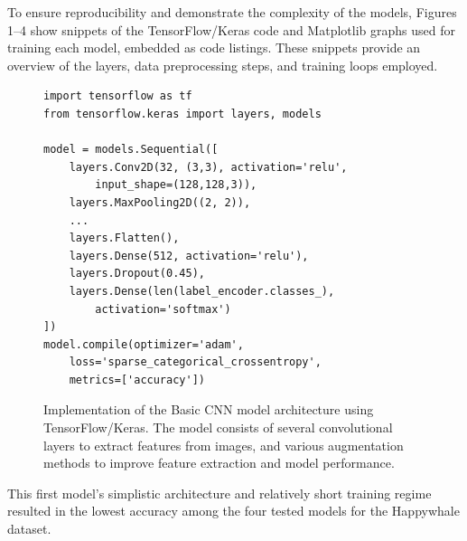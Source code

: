\documentclass[twocolumn]{article}
\begin{document}
To ensure reproducibility and demonstrate the complexity of the models, Figures 1–4 show snippets of the TensorFlow/Keras code and Matplotlib graphs used for training each model, embedded as code listings. These snippets provide an overview of the layers, data preprocessing steps, and training loops employed.

\lstset{
    language=Python,
    basicstyle=\footnotesize\ttfamily,
    breaklines=true,
    columns=fullflexible,
    frame=single
}

\begin{figure}[H]
\centering
\begin{minipage}{0.95\linewidth}
\begin{lstlisting}
import tensorflow as tf
from tensorflow.keras import layers, models

model = models.Sequential([
    layers.Conv2D(32, (3,3), activation='relu',
        input_shape=(128,128,3)),
    layers.MaxPooling2D((2, 2)),
    ...
    layers.Flatten(),
    layers.Dense(512, activation='relu'),
    layers.Dropout(0.45),
    layers.Dense(len(label_encoder.classes_),
        activation='softmax')
])
model.compile(optimizer='adam', 
    loss='sparse_categorical_crossentropy', 
    metrics=['accuracy'])
\end{lstlisting}
\end{minipage}
\caption{Implementation of the Basic CNN model architecture using TensorFlow/Keras. The model consists of several convolutional layers to extract features from images, and various augmentation methods to improve feature extraction and model performance.}
\label{fig:model1}
\end{figure}

This first model’s simplistic architecture and relatively short training regime resulted in the lowest accuracy among the four tested models for the Happywhale dataset.
\end{document}
